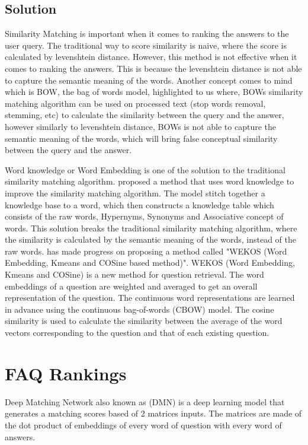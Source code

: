 \pagebreak
\subsection*{Solution}
Similarity Matching is important when it comes to ranking the answers to the user query. The traditional way to score similarity is naive, where the score is calculated by levenshtein distance. \cite{8054419} However, this method is not effective when it comes to ranking the answers. This is because the levenshtein distance is not able to capture the semantic meaning of the words. Another concept comes to mind which is BOW, the bag of words model, \cite{Improving_question_retrieval_in_community_question_answering_using_world_knowledge} highlighted to us where, BOWs similarity matching algorithm can be used on processed text (stop words removal, stemming, etc) to calculate the similarity between the query and the answer, however similarly to levenshtein distance, BOWs is not able to capture the semantic meaning of the words, which will bring false conceptual similarity between the query and the answer.

Word knowledge or Word Embedding is one of the solution to the traditional similarity matching algorithm. \cite{Improving_question_retrieval_in_community_question_answering_using_world_knowledge} proposed a method that uses word knowledge to improve the similarity matching algorithm. The model stitch together a knowledge base to a word, which then constructs a knowledge table which consists of the raw words, Hypernyms, Synonyms and Associative concept of words. This solution breaks the traditional similarity matching algorithm, where the similarity is calculated by the semantic meaning of the words, instead of the raw words. \cite{OTHMAN2019485} has made progress on proposing a method called "WEKOS (Word Embedding, Kmeans
and COSine based method)". WEKOS (Word Embedding, Kmeans and COSine) is a new method for question retrieval. The word embeddings of a question are weighted and averaged to get an overall representation of the question. The continuous word representations are learned in advance using the continuous bag-of-words (CBOW) model. \cite{OTHMAN2019485} The cosine similarity is used to calculate the similarity between the average of the word vectors corresponding to the question and that of each existing question.

\section{FAQ Rankings}
Deep Matching Network also known as (DMN) is a deep learning model that generates a matching scores based of 2 matrices inputs. The matrices are made of the dot product of embeddings of every word of question with every word of answers.

